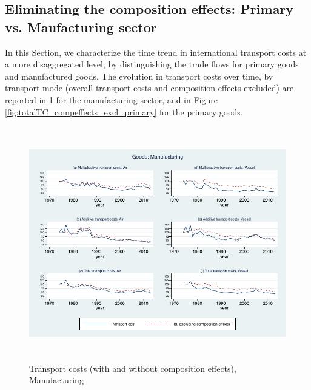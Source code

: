 \documentclass[11pt,twoside, authoryear]{elsarticle}
\begin{document}
\setcounter{table}{0}
\renewcommand{\thetable}{C.\arabic{table}}

\subsection{Eliminating the composition effects: Primary vs. Maufacturing sector} \label{sec_oa:comp-effects}



In this Section, we characterize the time trend in international transport costs at a more disaggregated level, by distinguishing the trade flows for primary goods and manufactured goods. The evolution in transport costs over time, by transport mode (overall transport costs and composition effects excluded) are reported in \ref{fig:totalTC_compeffects_excl_manuf} for the manufacturing sector, and in Figure \ref{fig:totalTC_compeffects_excl_primary} for the primary goods.

\begin{figure}[htbp]
\caption{Transport costs (with and without composition effects), Manufacturing}
\label{fig:totalTC_compeffects_excl_manuf}
\begin{center}
\includegraphics[height=4in]
{graph_composition_manuf.pdf}
\end{center}
\end{figure}
\end{document}
